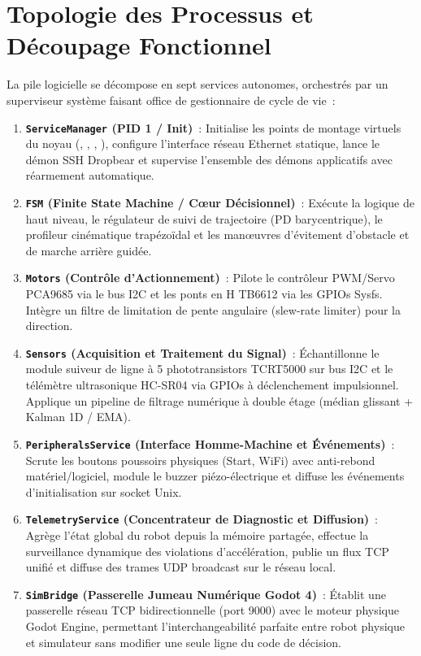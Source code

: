 \section{Topologie des Processus et Découpage Fonctionnel}
La pile logicielle se décompose en sept services autonomes, orchestrés par un superviseur système faisant office de gestionnaire de cycle de vie~:
\begin{enumerate}
    \item \textbf{\texttt{ServiceManager} (PID 1 / Init)}~: Initialise les points de montage virtuels du noyau (, , , ), configure l'interface réseau Ethernet statique, lance le démon SSH Dropbear et supervise l'ensemble des démons applicatifs avec réarmement automatique.
    \item \textbf{\texttt{FSM} (Finite State Machine / Cœur Décisionnel)}~: Exécute la logique de haut niveau, le régulateur de suivi de trajectoire (PD barycentrique), le profileur cinématique trapézoïdal et les manœuvres d'évitement d'obstacle et de marche arrière guidée.
    \item \textbf{\texttt{Motors} (Contrôle d'Actionnement)}~: Pilote le contrôleur PWM/Servo PCA9685 via le bus I2C et les ponts en H TB6612 via les GPIOs Sysfs. Intègre un filtre de limitation de pente angulaire (slew-rate limiter) pour la direction.
    \item \textbf{\texttt{Sensors} (Acquisition et Traitement du Signal)}~: Échantillonne le module suiveur de ligne à 5 phototransistors TCRT5000 sur bus I2C et le télémètre ultrasonique HC-SR04 via GPIOs à déclenchement impulsionnel. Applique un pipeline de filtrage numérique à double étage (médian glissant + Kalman 1D / EMA).
    \item \textbf{\texttt{PeripheralsService} (Interface Homme-Machine et Événements)}~: Scrute les boutons poussoirs physiques (Start, WiFi) avec anti-rebond matériel/logiciel, module le buzzer piézo-électrique et diffuse les événements d'initialisation sur socket Unix.
    \item \textbf{\texttt{TelemetryService} (Concentrateur de Diagnostic et Diffusion)}~: Agrège l'état global du robot depuis la mémoire partagée, effectue la surveillance dynamique des violations d'accélération, publie un flux TCP unifié et diffuse des trames UDP broadcast sur le réseau local.
    \item \textbf{\texttt{SimBridge} (Passerelle Jumeau Numérique Godot 4)}~: Établit une passerelle réseau TCP bidirectionnelle (port 9000) avec le moteur physique Godot Engine, permettant l'interchangeabilité parfaite entre robot physique et simulateur sans modifier une seule ligne du code de décision.
\end{enumerate}


